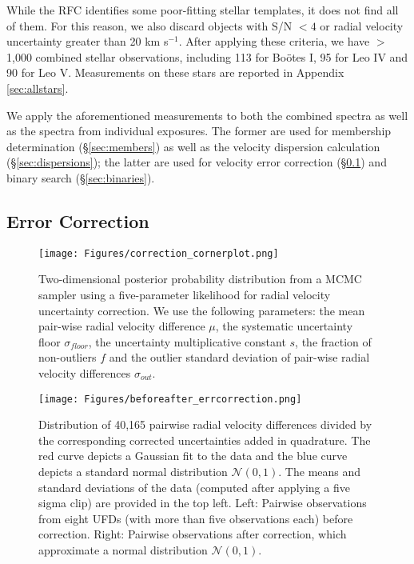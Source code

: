 \documentclass[twocolumn]{aastex63}
\begin{document}
While the RFC identifies some poor-fitting stellar templates, it does not find all of them. For this reason, we also discard objects with S/N $<4$ or radial velocity uncertainty greater than 20 km s$^{-1}$. After applying these criteria, we have $>$1,000 combined stellar observations, including 113 for Bo{\"o}tes I, 95 for Leo IV and 90 for Leo V. Measurements on these stars are reported in Appendix \ref{sec:allstars}.

We apply the aforementioned measurements to both the combined spectra as well as the spectra from individual exposures. The former are used for membership determination (\S\ref{sec:members}) as well as the velocity dispersion calculation (\S\ref{sec:dispersions}); the latter are used for velocity error correction (\S\ref{sec:error}) and binary search (\S\ref{sec:binaries}).

\subsection{Error Correction}
\label{sec:error}
\begin{figure}
\centering
\texttt{[image: Figures/correction\_cornerplot.png]}
\caption{Two-dimensional posterior probability distribution from a MCMC sampler using a five-parameter likelihood for radial velocity uncertainty correction. We use the following parameters: the mean pair-wise radial velocity difference $\mu$, the systematic uncertainty floor $\sigma_{floor}$, the uncertainty multiplicative constant $s$, the fraction of non-outliers $f$ and the outlier standard deviation of pair-wise radial velocity differences $\sigma_{out}$. \label{corner_uncertainty}}
\end{figure}
\begin{figure}
\centering
\texttt{[image: Figures/beforeafter\_errcorrection.png]}
\caption{Distribution of 40,165 pairwise radial velocity differences divided by the corresponding corrected uncertainties added in quadrature. The red curve depicts a Gaussian fit to the data and the blue curve depicts a standard normal distribution $\mathcal{N}(0,1)$. The means and standard deviations of the data (computed after applying a five sigma clip) are provided in the top left. Left: Pairwise observations from eight UFDs (with more than five observations each) before correction. Right: Pairwise observations after correction, which approximate a normal distribution $\mathcal{N}(0,1)$. \label{error_correction}}
\end{figure}
 
\end{document}
